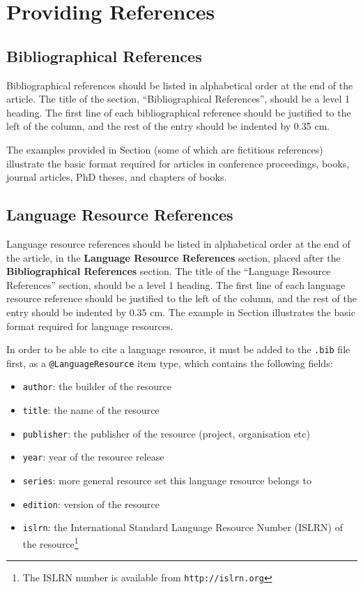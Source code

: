\documentclass[10pt, a4paper]{article}
\newcommand{\secref}[1]{\StrSubstitute{\getrefnumber{#1}}{.}{ }}
\begin{document}
\section{Providing References}

\subsection{Bibliographical References}
Bibliographical references should be listed in alphabetical order at the
end of the article. The title of the section, ``Bibliographical References'',
should be a level 1 heading. The first line of each bibliographical reference
should be justified to the left of the column, and the rest of the entry should
be indented by 0.35 cm.

The examples provided in Section \secref{main:ref} (some of which are fictitious
references) illustrate the basic format required for articles in conference
proceedings, books, journal articles, PhD theses, and chapters of books.

\subsection{Language Resource References}

Language resource references should be listed in alphabetical order at the end
of the article, in the \textbf{Language Resource References} section, placed after
the \textbf{Bibliographical References} section. The title of the ``Language Resource
References'' section, should be a level 1 heading. The first line of each
language resource reference should be justified to the left of the column, and
the rest of the entry should be indented by 0.35 cm. The example in Section
\secref{lr:ref} illustrates the basic format required for language resources.

In order to be able to cite a language resource, it must be added to
the \texttt{.bib} file first, as a \texttt{@LanguageResource} item type, which
contains the following fields:

\begin{itemize}
    \item{\texttt{author}: the builder of the resource}
    \item{\texttt{title}: the name of the resource}
    \item{\texttt{publisher}: the publisher of the resource (project,
          organisation etc)}
    \item{\texttt{year}: year of the resource release}
    \item{\texttt{series}: more general resource set this language resource
          belongs to}
    \item{\texttt{edition}: version of the resource}
    \item{\texttt{islrn}: the International Standard Language Resource Number
          (ISLRN) of the resource\footnote{The ISLRN number is available from
          \texttt{http://islrn.org}}}
\end{itemize}
\end{document}
